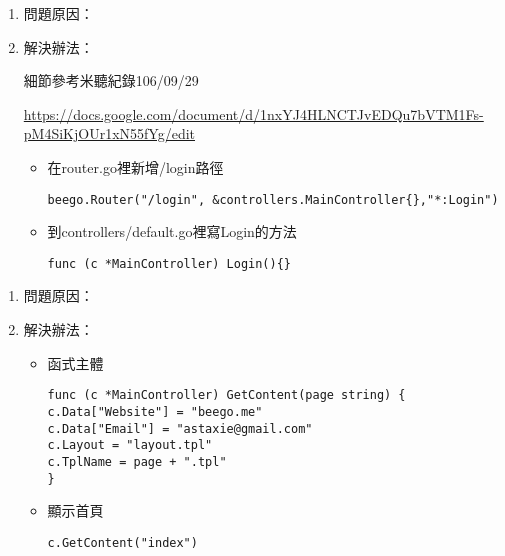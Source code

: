 


\begin{enumerate}
\item 問題原因：

\item 解決辦法：

細節參考米聽紀錄106/09/29

\url{https://docs.google.com/document/d/1nxYJ4HLNCTJvEDQu7bVTM1Fs-pM4SiKjOUr1xN55fYg/edit}
	\begin{itemize}
	\item 在router.go裡新增/login路徑
\begin{lstlisting}
beego.Router("/login", &controllers.MainController{},"*:Login")
\end{lstlisting}
	
	\item 到controllers/default.go裡寫Login的方法
\begin{lstlisting}
func (c *MainController) Login(){}
\end{lstlisting}
			
	\end{itemize}
\end{enumerate}



\begin{enumerate}
	\item 問題原因：
	
	\item 解決辦法：
	
	\begin{itemize}
		\item 函式主體

\begin{lstlisting}
func (c *MainController) GetContent(page string) {
c.Data["Website"] = "beego.me"
c.Data["Email"] = "astaxie@gmail.com"
c.Layout = "layout.tpl"
c.TplName = page + ".tpl"
}		
\end{lstlisting}
			
		\item 顯示首頁
		
\begin{lstlisting}
c.GetContent("index")
\end{lstlisting}
		
	\end{itemize}
\end{enumerate}

